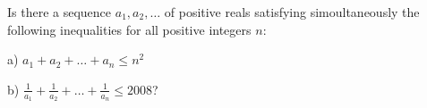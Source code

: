 Is there a sequence $ a_1,a_2,\ldots$ of positive reals satisfying simoultaneously the following inequalities for all positive integers $ n$:

a) $ a_1+a_2+\ldots+a_n\le n^2$

b) $ \frac1{a_1}+\frac1{a_2}+\ldots+\frac1{a_n}\le2008$?